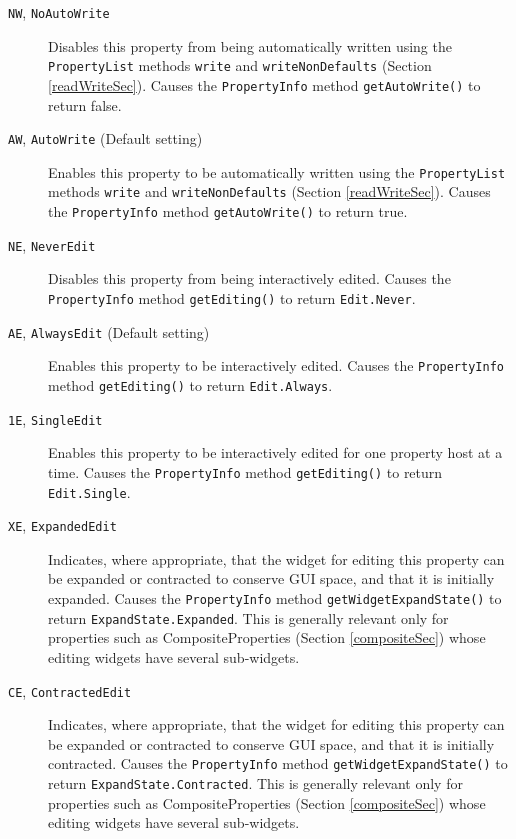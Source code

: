 \documentclass{article}
\begin{document}
\begin{description}

\item[{\tt NW}, {\tt NoAutoWrite}] \mbox{}

Disables this property from being
automatically written using the {\tt PropertyList} methods {\tt write}
and {\tt writeNonDefaults} (Section \ref{readWriteSec}). Causes
the {\tt PropertyInfo} method {\tt getAutoWrite()} to return false.

\item[{\tt AW}, {\tt AutoWrite} (Default setting)] \mbox{}

Enables this property to be
automatically written using the {\tt PropertyList} methods {\tt write}
and {\tt writeNonDefaults} (Section \ref{readWriteSec}). Causes the
{\tt PropertyInfo} method {\tt getAutoWrite()} to return true.

\item[{\tt NE}, {\tt NeverEdit}] \mbox{}

Disables this property from being
interactively edited.  Causes the {\tt PropertyInfo} method 
{\tt getEditing()} to return {\tt Edit.Never}.

\item[{\tt AE}, {\tt AlwaysEdit} (Default setting)] \mbox{}

Enables this
property to be interactively edited. 
Causes the {\tt PropertyInfo} method {\tt getEditing()} to return 
{\tt Edit.Always}.

\item[{\tt 1E}, {\tt SingleEdit}] \mbox{}

Enables this property to be
interactively edited for one property host at a time.  Causes the 
{\tt PropertyInfo} method {\tt getEditing()} to return {\tt Edit.Single}.

\item[{\tt XE}, {\tt ExpandedEdit}] \mbox{}

Indicates, where appropriate, that the widget
for editing this property can be expanded or contracted to conserve
GUI space, and that it is initially expanded.  Causes the
{\tt PropertyInfo} method {\tt getWidgetExpandState()} to return
{\tt ExpandState.Expanded}.  This is generally relevant only for
properties such as CompositeProperties (Section \ref{compositeSec}) whose
editing widgets have several sub-widgets.

\item[{\tt CE}, {\tt ContractedEdit}] \mbox{}

Indicates, where appropriate, that the widget
for editing this property can be expanded or contracted to conserve
GUI space, and that it is initially contracted.  Causes the
{\tt PropertyInfo} method {\tt getWidgetExpandState()} to return
{\tt ExpandState.Contracted}.  This is generally relevant only for
properties such as CompositeProperties (Section \ref{compositeSec}) whose
editing widgets have several sub-widgets.


\end{description}
\end{document}
